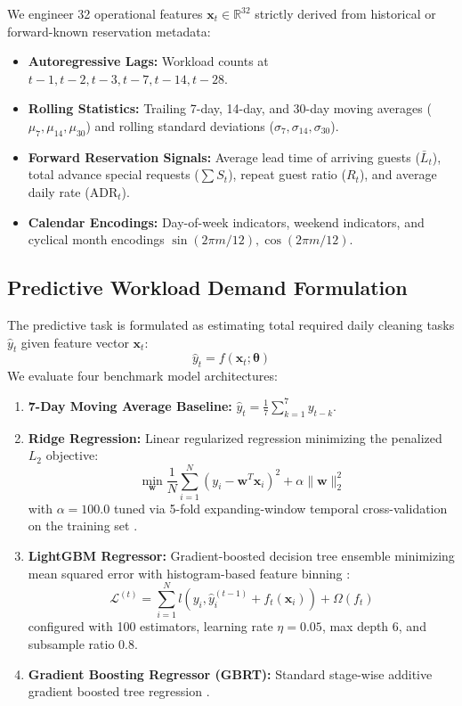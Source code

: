 \documentclass[11pt,a4paper]{article}
\begin{document}
We engineer 32 operational features $\mathbf{x}_t \in \mathbb{R}^{32}$ strictly derived from historical or forward-known reservation metadata:
\begin{itemize}
    \item \textbf{Autoregressive Lags:} Workload counts at $t-1, t-2, t-3, t-7, t-14, t-28$.
    \item \textbf{Rolling Statistics:} Trailing 7-day, 14-day, and 30-day moving averages ($\mu_7, \mu_{14}, \mu_{30}$) and rolling standard deviations ($\sigma_7, \sigma_{14}, \sigma_{30}$).
    \item \textbf{Forward Reservation Signals:} Average lead time of arriving guests ($\bar{L}_t$), total advance special requests ($\sum S_t$), repeat guest ratio ($R_t$), and average daily rate ($\text{ADR}_t$).
    \item \textbf{Calendar Encodings:} Day-of-week indicators, weekend indicators, and cyclical month encodings $\sin(2\pi m / 12), \cos(2\pi m / 12)$.
\end{itemize}

\subsection{Predictive Workload Demand Formulation}
The predictive task is formulated as estimating total required daily cleaning tasks $\hat{y}_t$ given feature vector $\mathbf{x}_t$:
\begin{equation}
\hat{y}_t = f(\mathbf{x}_t; \mathbf{\theta})
\end{equation}
We evaluate four benchmark model architectures:
\begin{enumerate}
    \item \textbf{7-Day Moving Average Baseline:} $\hat{y}_t = \frac{1}{7} \sum_{k=1}^7 y_{t-k}$.
    \item \textbf{Ridge Regression:} Linear regularized regression minimizing the penalized $L_2$ objective:
    \begin{equation}
    \min_{\mathbf{w}} \frac{1}{N} \sum_{i=1}^N \left( y_i - \mathbf{w}^T \mathbf{x}_i \right)^2 + \alpha \|\mathbf{w}\|_2^2
    \end{equation}
    with $\alpha = 100.0$ tuned via 5-fold expanding-window temporal cross-validation on the training set \cite{hoerl1970}.
    \item \textbf{LightGBM Regressor:} Gradient-boosted decision tree ensemble minimizing mean squared error with histogram-based feature binning \cite{chen2016}:
    \begin{equation}
    \mathcal{L}^{(t)} = \sum_{i=1}^N l\left(y_i, \hat{y}_i^{(t-1)} + f_t(\mathbf{x}_i)\right) + \Omega(f_t)
    \end{equation}
    configured with 100 estimators, learning rate $\eta = 0.05$, max depth 6, and subsample ratio 0.8.
    \item \textbf{Gradient Boosting Regressor (GBRT):} Standard stage-wise additive gradient boosted tree regression \cite{breiman2001,chen2016}.
\end{enumerate}
\end{document}
